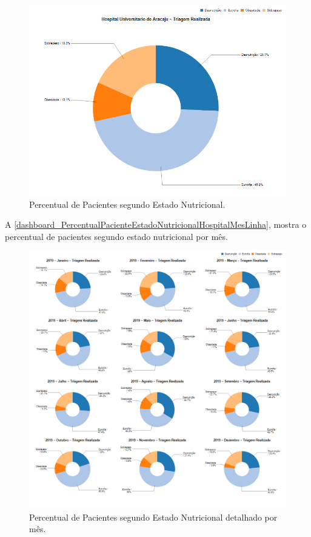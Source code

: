 \begin{figure}[htb]
	\caption{\label{dashboard_PercentualPacienteEstadoNutricionalHospitalAnoPizza}Percentual de Pacientes segundo Estado Nutricional.}
	\begin{center}
	    \includegraphics[scale=0.6]{Imagens/3.1.PercentualPacienteEstadoNutricionalHospitalAnoPizza.png}
	\end{center}
\end{figure}

\newpage
A \autoref{dashboard_PercentualPacienteEstadoNutricionalHospitalMesLinha}, mostra o percentual de pacientes segundo estado nutricional por mês.

\begin{figure}[htb]
	\caption{\label{dashboard_PercentualPacienteEstadoNutricionalHospitalMesLinha}Percentual de Pacientes segundo Estado Nutricional detalhado por mês.}
	\begin{center}
	    \includegraphics[scale=0.6]{Imagens/3.2.PercentualPacienteEstadoNutricionalHospitalMesLinha.png}
	\end{center}
\end{figure}

